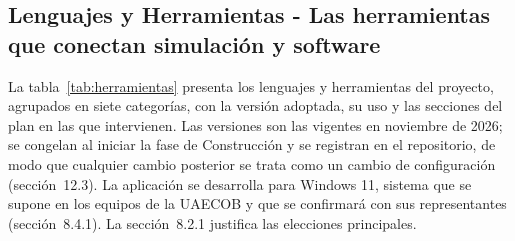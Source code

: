 
\subsection{Lenguajes y Herramientas - Las herramientas que conectan simulación y software}\label{sec:spmp-8-2}


La tabla~\ref{tab:herramientas} presenta los lenguajes y herramientas del proyecto, agrupados en siete categorías, con la versión adoptada, su uso y las secciones del plan en las que intervienen. Las versiones son las vigentes en noviembre de 2026; se congelan al iniciar la fase de Construcción y se registran en el repositorio, de modo que cualquier cambio posterior se trata como un cambio de configuración (sección~12.3). La aplicación se desarrolla para Windows 11, sistema que se supone en los equipos de la UAECOB y que se confirmará con sus representantes (sección~8.4.1). La sección~8.2.1 justifica las elecciones principales.

